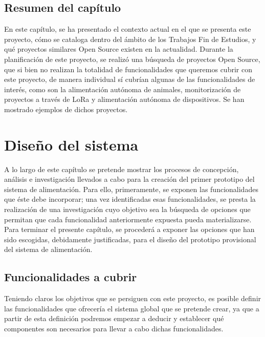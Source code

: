 \documentclass[12pt]{article}
\begin{document}
	\subsection[Resumen del capítulo]{Resumen del capítulo}
	
	\noindent En este capítulo, se ha presentado el contexto actual en el que se presenta este proyecto, cómo se cataloga dentro del ámbito de los Trabajos Fin de Estudios, y qué proyectos similares Open Source existen en la actualidad. Durante la planificación de este proyecto, se realizó una búsqueda de proyectos Open Source, que si bien no realizan la totalidad de funcionalidades que queremos cubrir con este proyecto, de manera individual sí cubrían algunas de las funcionalidades de interés, como son la alimentación autónoma de animales, monitorización de proyectos a través de LoRa y alimentación autónoma de dispositivos. Se han mostrado ejemplos de dichos proyectos.
	
	\pagebreak
	
	\section[Diseño del sistema]{Diseño del sistema}
	\label{Sección 3: Diseño del sistema}
	\noindent A lo largo de este capítulo se pretende mostrar los procesos de concepción, análisis e investigación llevados a cabo para la creación del primer prototipo del sistema de alimentación. Para ello, primeramente, se exponen las funcionalidades que éste debe incorporar; una vez identificadas esas funcionalidades, se presta la realización de una investigación cuyo objetivo sea la búsqueda de opciones que permitan que cada funcionalidad anteriormente expuesta pueda materializarse. Para terminar el presente capítulo, se procederá a exponer las opciones que han sido escogidas, debidamente justificadas, para el diseño del prototipo provisional del sistema de alimentación. 
	
	\subsection[Funcionalidades a cubrir]{Funcionalidades a cubrir}
	\label{subsection: funcionalidades a cubrir}
	
	\noindent Teniendo claros los objetivos que se persiguen con este proyecto, es posible definir las funcionalidades que ofrecería el sistema global que se pretende crear, ya que a partir de esta definición podremos empezar a deducir y establecer qué componentes son necesarios para llevar a cabo dichas funcionalidades. \\
	
\end{document}

